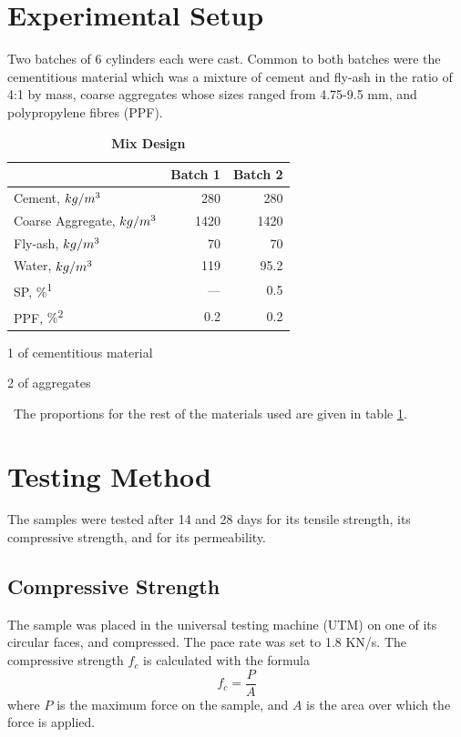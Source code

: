 \documentclass{ieeeaccess}
\begin{document}
\section{Experimental Setup}
Two batches of 6 cylinders each were cast. Common to both batches were the
cementitious material which was a mixture of cement and fly-ash in the ratio of 
4:1 by mass, coarse aggregates whose sizes ranged from 4.75-9.5 mm, 
and polypropylene fibres (PPF). 
\
\begin{table}
    \begin{threeparttable}
        \caption{\textbf{Mix Design}}
        \label{table:mix-design}
        \setlength{\tabcolsep}{20pt}
        \def\arraystretch{1.5}%
        \begin{tabular}{ l r  r }
            \hline
            & \multicolumn{1}{c}{Batch 1} & \multicolumn{1}{c}{Batch 2} \\
            \hline
            Cement, $kg/m\textsuperscript{3}$  & 280  & 280  \\
            Coarse Aggregate, $kg/m\textsuperscript{3}$ & 1420 & 1420 \\
            Fly-ash, $kg/m\textsuperscript{3}$ & 70   & 70   \\
            Water, $kg/m\textsuperscript{3}$   & 119  & 95.2 \\
            SP, $\%$\textsuperscript{1}        & ---  & 0.5  \\
            PPF, $\%$\textsuperscript{2}       & 0.2  & 0.2  \\
            \hline
        \end{tabular} 
        \begin{tablenotes}
            \item[1] \footnotesize of cementitious material
            \item[2] \footnotesize of aggregates
        \end{tablenotes}
    \end{threeparttable}
\end{table}
\
The proportions for the rest of the materials used are given in table 
\ref{table:mix-design}.

\section{Testing Method}
The samples were tested after 14 and 28 days for its tensile strength, its
compressive strength, and for its permeability.

\subsection{Compressive Strength}
The sample was placed in the universal testing machine (UTM) on one of its 
circular faces, and compressed. The pace rate was set to 1.8 KN/s. 
The compressive strength $f_c$ is calculated with the formula 
\[f_c = \frac{P}{A}\] where $P$ is the maximum force on the sample, and $A$ is
the area over which the force is applied.
\end{document}
